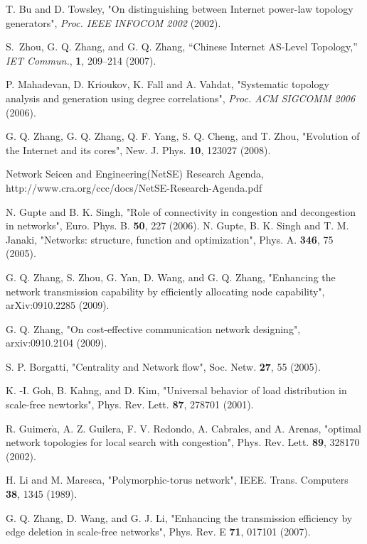 \documentclass[journal]{IEEEtran}
\begin{document}
{\begin{thebibliography}{5}
 T. Bu and D. Towsley, "On distinguishing between
Internet power-law topology generators", \emph{Proc. IEEE INFOCOM
2002} (2002).

S.~Zhou, G. Q. Zhang, and G. Q. Zhang, ``{Chinese Internet AS-Level
  Topology},'' \emph{IET Commun.}, {\bf 1}, 209--214 (2007).

 P. Mahadevan, D. Krioukov, K. Fall and A.
Vahdat, "Systematic topology analysis and generation using degree
correlations", \emph{Proc. ACM SIGCOMM 2006} (2006).

G. Q. Zhang, G. Q. Zhang, Q. F. Yang,
S. Q. Cheng, and T. Zhou, "Evolution of the Internet and its cores",
New. J. Phys. {\bf 10}, 123027 (2008).



Network Seicen and Engineering(NetSE) Research
Agenda, http://www.cra.org/ccc/docs/NetSE-Research-Agenda.pdf

 N. Gupte and B. K. Singh,  "Role of connectivity in congestion and decongestion in networks", Euro. Phys. B. {\bf 50}, 227 (2006).
N. Gupte, B. K. Singh and T. M. Janaki, "Networks: structure, function and optimization", Phys. A.
{\bf 346}, 75 (2005).

 G. Q. Zhang, S. Zhou, G.
Yan, D. Wang, and G. Q. Zhang, "Enhancing the network transmission
capability by efficiently allocating node capability",
arXiv:0910.2285 (2009).

 G. Q. Zhang, "On cost-effective
communication network designing", arxiv:0910.2104 (2009).

 S. P. Borgatti,  "Centrality and Network flow", Soc. Netw. {\bf 27}, 55
(2005).

 K. -I. Goh, B. Kahng, and D. Kim, "Universal behavior of load distribution in scale-free newtorks", Phys. Rev. Lett. {\bf
87}, 278701 (2001).

 R. Guimer$\grave{a}$, A. Z. Guilera, F. V. Redondo, A. Cabrales, and A. Arenas, "optimal network topologies for local search with congestion", Phys. Rev. Lett. {\bf 89}, 328170
(2002).

 H. Li and M. Maresca, "Polymorphic-torus network", IEEE. Trans. Computers {\bf 38}, 1345
(1989).

 G. Q. Zhang, D. Wang, and G. J. Li, "Enhancing the transmission efficiency by edge deletion in scale-free networks", Phys. Rev. E {\bf 71}, 017101
(2007).


\end{thebibliography}}
\end{document}
